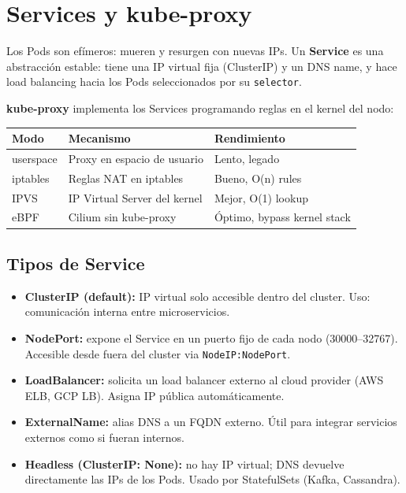 \section{ Services y kube-proxy}

\begin{concepto}
Los Pods son efímeros: mueren y resurgen con nuevas IPs. Un \textbf{Service} es una
abstracción estable: tiene una IP virtual fija (ClusterIP) y un DNS name, y hace
load balancing hacia los Pods seleccionados por su \texttt{selector}.

\textbf{kube-proxy} implementa los Services programando reglas en el kernel del nodo:
\end{concepto}

\begin{center}
\begin{tabular}{lll}
\toprule
\textbf{Modo} & \textbf{Mecanismo} & \textbf{Rendimiento} \\
\midrule
userspace & Proxy en espacio de usuario & Lento, legado \\
iptables  & Reglas NAT en iptables       & Bueno, O(n) rules \\
IPVS      & IP Virtual Server del kernel & Mejor, O(1) lookup \\
eBPF      & Cilium sin kube-proxy        & Óptimo, bypass kernel stack \\
\bottomrule
\end{tabular}
\end{center}

\subsection{Tipos de Service}

\begin{itemize}
    \item \textbf{ClusterIP (default):} IP virtual solo accesible dentro del cluster.
          Uso: comunicación interna entre microservicios.
    \item \textbf{NodePort:} expone el Service en un puerto fijo de cada nodo
          (30000--32767). Accesible desde fuera del cluster via \texttt{NodeIP:NodePort}.
    \item \textbf{LoadBalancer:} solicita un load balancer externo al cloud provider
          (AWS ELB, GCP LB). Asigna IP pública automáticamente.
    \item \textbf{ExternalName:} alias DNS a un FQDN externo. Útil para integrar
          servicios externos como si fueran internos.
    \item \textbf{Headless (ClusterIP: None):} no hay IP virtual; DNS devuelve
          directamente las IPs de los Pods. Usado por StatefulSets (Kafka, Cassandra).
\end{itemize}

